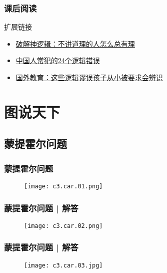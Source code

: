 \begin{frame}
  \frametitle{课后阅读}
  \begin{block}{扩展链接}
    \begin{itemize}
      \item \href{http://www.thepaper.cn/newsDetail_forward_1500302}{破解神逻辑：不讲道理的人怎么总有理}
      \item \href{https://wx.abbao.cn/a/5248-c37c59ef8e0cd008.html}{中国人常犯的24个逻辑错误}
      \item \href{http://www.edu0-6.com/zixunzhuanqu/xingyedongtai/2216.html}{国外教育：这些逻辑谬误孩子从小被要求会辨识}
    \end{itemize}
  \end{block}
\end{frame}

\section{图说天下}
\subsection{蒙提霍尔问题}
\begin{frame}
  \frametitle{蒙提霍尔问题}
  \begin{figure}
    \centering
    \texttt{[image: c3.car.01.png]}
  \end{figure}
\end{frame}

\begin{frame}
  \frametitle{蒙提霍尔问题 | 解答}
  \begin{figure}
    \centering
    \texttt{[image: c3.car.02.png]}
  \end{figure}
\end{frame}
\begin{frame}
  \frametitle{蒙提霍尔问题 | 解答}
  \begin{figure}
    \centering
    \texttt{[image: c3.car.03.jpg]}
  \end{figure}
\end{frame}


